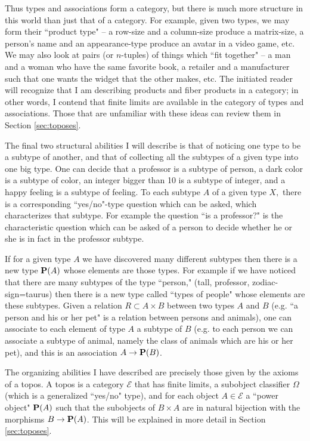 \documentclass{amsart}
\def\mc{\mathcal}
\def\to{\rightarrow}
\def\cross{\times}
\def\ss{\subset}
\def\mcE{\mc{E}}
\theoremstyle{remark}
\theoremstyle{definition}
\def\P{{\bf P}}
\begin{document}
Thus types and associations form a category, but there is much more structure in this world than just that of a category.  For example, given two types, we may form their ``product type" -- a row-size and a column-size produce a matrix-size, a person's name and an appearance-type produce an avatar in a video game, etc.  We may also look at pairs (or $n$-tuples) of things which ``fit together" -- a man and a woman who have the same favorite book, a retailer and a manufacturer such that one wants the widget that the other makes, etc.  The initiated reader will recognize that I am describing products and fiber products in a category; in other words, I contend that finite limits are available in the category of types and associations.  Those that are unfamiliar with these ideas can review them in Section \ref{sec:toposes}.

The final two structural abilities I will describe is that of noticing one type to be a subtype of another, and that of collecting all the subtypes of a given type into one big type.  One can decide that a professor is a subtype of person, a dark color is a subtype of color, an integer bigger than 10 is a subtype of integer, and a happy feeling is a subtype of feeling.  To each subtype $A$ of a given type $X,$ there is a corresponding ``yes/no"-type question which can be asked, which characterizes that subtype.  For example the question ``is a professor?" is the characteristic question which can be asked of a person to decide whether he or she is in fact in the professor subtype.  

If for a given type $A$ we have discovered many different subtypes then there is a new type $\P(A)$ whose elements are those types.  For example if we have noticed that there are many subtypes of the type ``person," (tall,  professor, zodiac-sign=taurus) then there is a new type called ``types of people" whose elements are these subtypes.  Given a relation $R\ss A\cross B$ between two types $A$ and $B$ (e.g. ``a person and his or her pet" is a relation between persons and animals), one can associate to each element of type $A$ a subtype of $B$ (e.g. to each person we can associate a subtype of animal, namely the class of animals which are his or her pet), and this is an association $A\to\P(B)$.

The organizing abilities I have described are precisely those given by the axioms of a topos.  A topos is a category $\mcE$ that has finite limits, a subobject classifier $\Omega$ (which is a generalized ``yes/no" type), and for each object $A\in\mcE$ a ``power object" $\P(A)$ such that the subobjects of $B\cross A$ are in natural bijection with the morphisms $B\to\P(A)$.  This will be explained in more detail in Section \ref{sec:toposes}.
\end{document}
